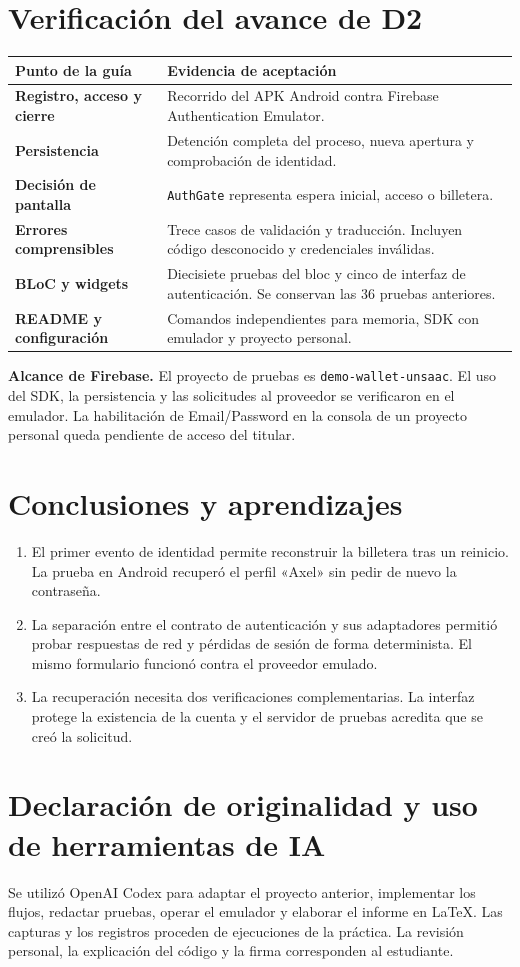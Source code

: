 \documentclass[11pt,letterpaper]{article}
\makeatletter
\newcommand{\tabla}[2]{\par\smallskip\begin{tabularx}{\linewidth}{@{}>{\bfseries\color{vino}}p{.28\linewidth}X@{}}\toprule\rowcolor{rosa}#1\\\midrule #2\bottomrule\end{tabularx}\par}
\newcommand{\ruta}[1]{\nolinkurl{#1}}
\makeatother
\begin{document}
\section{Verificación del avance de D2}
\tabla{Punto de la guía & Evidencia de aceptación}{Registro, acceso y cierre & Recorrido del APK Android contra Firebase Authentication Emulator.\\Persistencia & Detención completa del proceso, nueva apertura y comprobación de identidad.\\Decisión de pantalla & \texttt{AuthGate} representa espera inicial, acceso o billetera.\\Errores comprensibles & Trece casos de validación y traducción. Incluyen código desconocido y credenciales inválidas.\\BLoC y widgets & Diecisiete pruebas del bloc y cinco de interfaz de autenticación. Se conservan las 36 pruebas anteriores.\\README y configuración & Comandos independientes para memoria, SDK con emulador y proyecto personal.\\}
\textbf{Alcance de Firebase.} El proyecto de pruebas es \ruta{demo-wallet-unsaac}. El uso del SDK, la persistencia y las solicitudes al proveedor se verificaron en el emulador. La habilitación de Email/Password en la consola de un proyecto personal queda pendiente de acceso del titular.
\section{Conclusiones y aprendizajes}
\begin{enumerate}
\item El primer evento de identidad permite reconstruir la billetera tras un reinicio. La prueba en Android recuperó el perfil «Axel» sin pedir de nuevo la contraseña.
\item La separación entre el contrato de autenticación y sus adaptadores permitió probar respuestas de red y pérdidas de sesión de forma determinista. El mismo formulario funcionó contra el proveedor emulado.
\item La recuperación necesita dos verificaciones complementarias. La interfaz protege la existencia de la cuenta y el servidor de pruebas acredita que se creó la solicitud.
\end{enumerate}
\newpage
\section{Declaración de originalidad y uso de herramientas de IA}
Se utilizó OpenAI Codex para adaptar el proyecto anterior, implementar los flujos, redactar pruebas, operar el emulador y elaborar el informe en LaTeX. Las capturas y los registros proceden de ejecuciones de la práctica. La revisión personal, la explicación del código y la firma corresponden al estudiante.
\medskip
\end{document}

